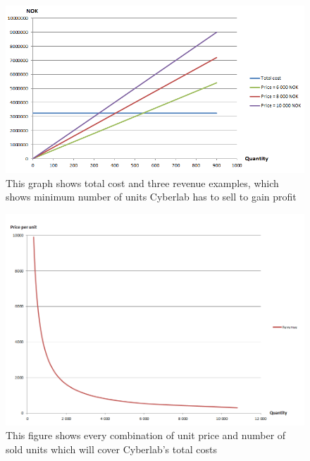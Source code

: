 \begin{figure}
\begin{center}
\includegraphics[scale=0.7]{revenuestreamquantity}
\caption[Quantity examples]{This graph shows total cost and three revenue examples, which shows minimum number of units Cyberlab has to sell to gain profit}
\label{fig:RevenueStreamQuantity}
\end{center}
\end{figure}
\begin{figure}
\includegraphics[scale=0.6]{relationpriceandunits}
\caption[Relation between price per unit and number of sold units]{This figure shows every combination of unit price and number of sold units which will cover Cyberlab's total costs}
\label{fig:RelationPriceAndUnits}
\end{figure}
